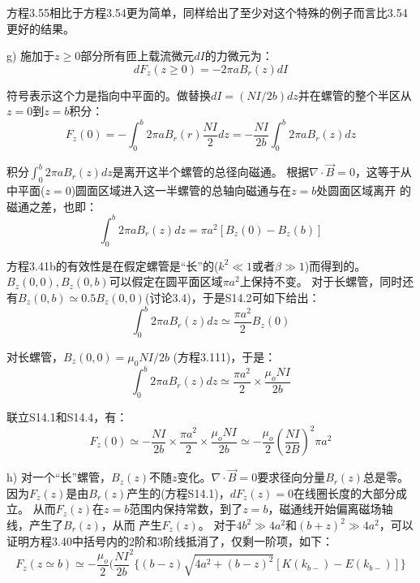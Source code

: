 方程3.55相比于方程3.54更为简单，同样给出了至少对这个特殊的例子而言比3.54更好的结果。

g) 施加于$z\ge 0$部分所有匝上载流微元$dI$的力微元为：
\begin{equation*}
dF_z(z\ge 0)=-2\pi a B_r(z)d I
\end{equation*}

符号表示这个力是指向中平面的。做替换$dI = (NI/2b) dz$并在螺管的整个半区从$z=0$到$z=b$积分： 
\begin{equation*}
F_{z}(0)=-\int_{0}^{b}2\pi aB_{r}(r)\frac{NI}{2}dz=-\frac{NI}{2b}\int_{0}^{b}2\pi aB_{r}(z)dz\tag{S14.1}%
\end{equation*}

积分$\int_0^b 2\pi a B_r(z)dz$是离开这半个螺管的总径向磁通。
根据$\nabla\cdot \vec{B}=0$，这等于从中平面($z=0$)圆面区域进入这一半螺管的总轴向磁通与在$z=b$处圆面区域离开
的磁通之差，也即：
\begin{equation*}
\int_{0}^{b}2\pi aB_{r}(z)dz=\pi a^{2}[B_{z}(0)-B_{z}(b)]\tag{S14.2}%
\end{equation*}

方程3.41b的有效性是在假定螺管是“长”的($k^2\ll 1$或者$\beta\gg 1$)而得到的。
$B_z(0, 0),B_z(0, b)$可以假定在圆平面区域$\pi a^2$上保持不变。
对于长螺管，同时还有$B_z(0, b)\simeq 0.5 B_z(0,0)$(讨论3.4)，于是S14.2可如下给出：
\begin{equation*}
\int_{0}^{b}2\pi aB_{r}(z)dz\simeq\frac{\pi a^{2}}{2}B_{z}(0)\tag{S14.3}%
\end{equation*}

对长螺管，$B_z(0, 0)=\mu_0 NI/2b$ (方程3.111)，于是：
\begin{equation*}
\int_{0}^{b}2\pi aB_{r}(z)dz\simeq\frac{\pi a^{2}}{2}\times\frac{\mu_{o}NI}{2b}\tag{S14.4}%
\end{equation*}

联立S14.1和S14.4，有：
\begin{equation*}
F_{z}(0)\simeq-\frac{NI}{2b}\times\frac{\pi a^{2}}{2}\times\frac{\mu_{o}NI}{2b}\simeq-\frac{\mu_{o}}{2}(\frac{NI}{2B})^{2}\pi a^{2}\tag{3.41b}%
\end{equation*}

h) 对一个“长”螺管，$B_z(z)$不随$z$变化。$\nabla\cdot \vec{B}=0$要求径向分量$B_r(z)$总是零。
因为$F_z(z)$是由$B_r(z)$产生的(方程S14.1)，$dF_z(z)=0$在线圈长度的大部分成立。
从而$F_z(z)$在$z=b$范围内保持常数，到了$z =b$，磁通线开始偏离磁场轴线，产生了$B_r(z)$，从而
产生$F_z(z)$。
对于$4b^2\gg 4a^2$和$(b+z)^2\gg 4a^2$，可以证明方程3.40中括号内的2阶和3阶线抵消了，仅剩一阶项，如下：
\begin{equation*}
F_{z}(z\simeq b)\simeq-\frac{\mu_{o}}{2}(\frac{NI}{2b}^{2}\{(b-z)\sqrt{4a^{2}+(b-z)^{2}}[K(k_{b-})-E(k_{b-})]\}\tag{S14.5}%
\end{equation*}

